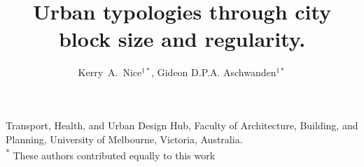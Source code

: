 \documentclass{nature}
\title{Urban typologies through city block size and regularity.}
\author{Kerry~A.~Nice$^{1*}$,
Gideon D.P.A. Aschwanden$^{1*}$
}
\begin{document}
\maketitle

\begin{affiliations}
 \item Transport, Health, and Urban Design Hub, Faculty of Architecture, Building, and Planning, University of Melbourne, Victoria, Australia.
 \\ \textsuperscript{*} These authors contributed equally to this work
\end{affiliations}
\end{document}
